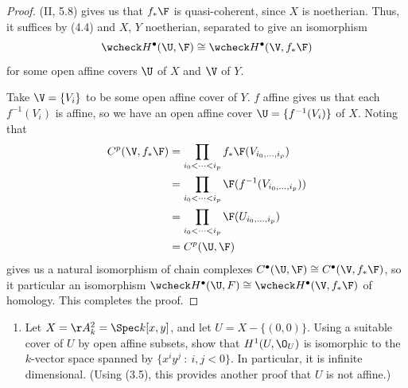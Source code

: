 \documentclass[12pt]{amsart}
\begin{document}
\begin{proof}
  (II, 5.8) gives us that $f_*\F$ is quasi-coherent, since $X$ is noetherian.
  Thus, it suffices by (4.4) and $X$, $Y$ noetherian, separated to give an isomorphism
  \[
    \wcheck H^\bullet(\U,\F)\cong \wcheck H^\bullet(\V,f_*\F)
  \] 
  for some open affine covers $\U$ of $X$ and $\V$ of $Y$.

  Take $\V=\{V_i\}$ to be some open affine cover of $Y$.
  $f$ affine gives us that each $f^{-1}(V_i)$ is affine, so we have an open affine cover $\U=\{f^{-1}(V_i)\}$ of $X$.
  Noting that
  \begin{align*}
    C^p(\V,f_*\F) 
    &= \prod_{i_0<\cdots<i_p}f_*\F(V_{i_0,\ldots, i_p}) \\
    &= \prod_{i_0<\cdots<i_p}\F(f^{-1}(V_{i_0,\ldots, i_p})) \\
    &= \prod_{i_0<\cdots<i_p}\F(U_{i_0,\ldots, i_p}) \\
    &= C^p(\U,\F)
  \end{align*}
  gives us a natural isomorphism of chain complexes $C^\bullet(\U,\F)\cong C^\bullet(\V,f_*\F)$, so it particular an isomorphism $\wcheck H^\bullet(\U,F)\cong \wcheck H^\bullet(\V,f_*\F)$ of homology.
  This completes the proof.
\end{proof}

\begin{enumerate}
  \item[4.3.] {
      Let $X=\AA_k^2=\Spec k[x,y]$, and let $U=X-\{(0,0)\}$.
      Using a suitable cover of $U$ by open affine subsets, show that $H^1(U,\O_U)$ is isomorphic to the $k$-vector space spanned by $\{x^iy^j~:~i,j<0\}$.
      In particular, it is infinite dimensional.
      (Using (3.5), this provides another proof that $U$ is not affine.)
    }
\end{enumerate}
\end{document}
